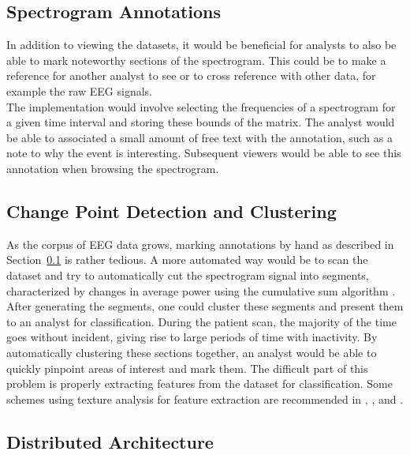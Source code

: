 \subsection{Spectrogram Annotations}\label{discuss-ch:annotations}

In addition to viewing the datasets, it would be beneficial for analysts to
also be able to mark noteworthy sections of the spectrogram. This could be to
make a reference for another analyst to see or to cross reference with other
data, for example the raw EEG signals. \\

The implementation would involve selecting the frequencies of a spectrogram for
a given time interval and storing these bounds of the matrix.  The analyst
would be able to associated a small amount of free text with the annotation,
such as a note to why the event is interesting. Subsequent viewers would be
able to see this annotation when browsing the spectrogram.

\subsection{Change Point Detection and Clustering}\label{discuss-ch:cpd}

As the corpus of EEG data grows, marking annotations by hand as described in
Section~\ref{discuss-ch:annotations} is rather tedious.  A more automated way
would be to scan the dataset and try to automatically cut the spectrogram signal
into segments, characterized by changes in average power using the cumulative
sum algorithm \cite{cumsum}. After generating the segments, one could cluster these
segments and present them to an analyst for classification. During the patient
scan, the majority of the time goes without incident, giving rise to large
periods of time with inactivity. By automatically clustering these sections
together, an analyst would be able to quickly pinpoint areas of interest and
mark them. The difficult part of this problem is properly extracting features
from the dataset for classification. Some schemes using texture analysis for
feature extraction are recommended in \cite{texture-classification1},
\cite{texture-classification2}, and \cite{auto-segment}. \\

\subsection{Distributed Architecture}\label{discuss-ch:dist-arch}

